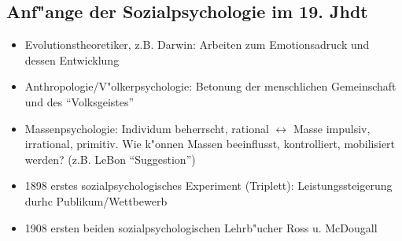 \subsection{Anf"ange der Sozialpsychologie im 19. Jhdt}
\begin{itemize}
	\item
		Evolutionstheoretiker, z.B. Darwin: Arbeiten zum Emotionsadruck und dessen Entwicklung
	\item
		Anthropologie/V"olkerpsychologie: Betonung der menschlichen Gemeinschaft und des \enquote{Volksgeistes}
	\item
		Massenpsychologie: Individum beherrscht, rational $\leftrightarrow$ Masse impulsiv, irrational, primitiv. Wie k"onnen Massen beeinflusst, kontrolliert, mobilisiert werden? (z.B. LeBon \enquote{Suggestion})
	\item
		1898 erstes sozialpsychologisches Experiment (Triplett): Leistungssteigerung durhc Publikum/Wettbewerb
	\item
		1908 ersten beiden sozialpsychologischen Lehrb"ucher Ross u. McDougall
\end{itemize}
